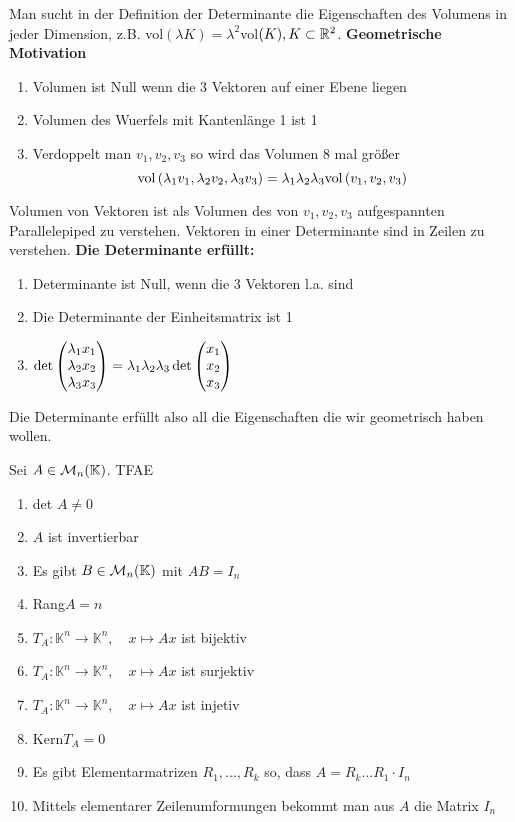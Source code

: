 \begin{remark}
    Man sucht in der Definition der Determinante die \glqq Eigenschaften des Volumens\grqq
    in jeder Dimension, z.B. vol$(\lambda K) = \lambda^2$vol$(K), K\subset\mathbb{R}^2$.
    \newline\textbf{Geometrische Motivation} \begin{enumerate}
        \item Volumen ist Null wenn die 3 Vektoren auf einer Ebene liegen
        \item Volumen des Wuerfels mit Kantenlänge 1 ist 1 
        \item Verdoppelt man $v_1,v_2,v_3$ so wird das Volumen 8 mal größer \[
            \text{vol}\left(\lambda_1v_1, \lambda_2v_2, \lambda_3v_3\right) = \lambda_1\lambda_2
            \lambda_3\text{vol}\left(v_1,v_2,v_3\right)\]
    \end{enumerate}
    Volumen von Vektoren ist als Volumen des von $v_1,v_2,v_3$ aufgespannten 
    Parallelepiped zu verstehen. Vektoren in einer Determinante sind in Zeilen zu 
    verstehen.
    \newline\textbf{Die Determinante erfüllt:}\begin{enumerate}
        \item Determinante ist Null, wenn die 3 Vektoren l.a. sind
        \item Die Determinante der Einheitsmatrix ist 1
        \item $\det \begin{pmatrix}\lambda_1x_1\\\lambda_2x_2\\\lambda_3x_3\end{pmatrix} = \lambda_1
        \lambda_2\lambda_3 \det\begin{pmatrix}x_1\\x_2\\x_3\end{pmatrix}$
    \end{enumerate}
    Die Determinante erfüllt also all die Eigenschaften die wir geometrisch haben
    wollen.
\end{remark}
\begin{definition}
Sei $A \in \mathcal{M}_{n}(\mathbb{K})$. TFAE
\begin{enumerate}
    \item det $A \neq 0$
    \item $A$ ist invertierbar
    \item Es gibt $B \in \mathcal{M}_{n}(\mathbb{K})$ mit $AB = I_n$
    \item Rang$A=n$
    \item $T_A: \mathbb{K}^n \to \mathbb{K}^n, \quad x\mapsto Ax$ ist bijektiv
    \item $T_A: \mathbb{K}^n \to \mathbb{K}^n, \quad x\mapsto Ax$ ist surjektiv
    \item $T_A: \mathbb{K}^n \to \mathbb{K}^n, \quad x\mapsto Ax$ ist injetiv
    \item Kern$T_A=0$
    \item Es gibt Elementarmatrizen $R_1,...,R_k$ so, dass $A=R_k...R_1\cdot I_n$
    \item Mittels elementarer Zeilenumformungen bekommt man aus $A$ die Matrix $I_n$
    \end{enumerate}
\end{definition}

